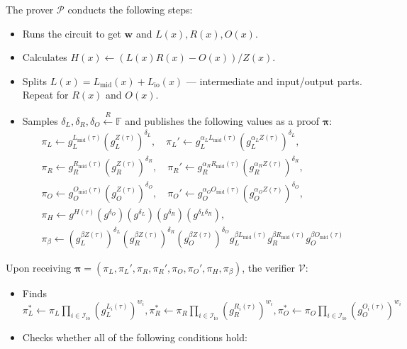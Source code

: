 \documentclass[../lecture-notes.tex]{subfiles}
\begin{document}
\begin{tcolorbox}
    The prover $\mathcal{P}$ conducts the following steps:
    \begin{itemize}[label=]
        \item Runs the circuit to get $\mathbf{w}$ and $L(x),R(x),O(x)$.
        \item Calculates $H(x) \gets (L(x)R(x) - O(x))\big/ Z(x)$.
        \item Splits $L(x) = L_{\text{mid}}(x) + L_{\text{io}}(x)$ --- intermediate and input/output parts. Repeat for $R(x)$ and $O(x)$.
        \item Samples $\delta_L, \delta_R, \delta_O \xleftarrow{R} \mathbb{F}$ and publishes the following values as a proof $\boldsymbol{\pi}$: 
        \begin{align*}
            \pi_L \gets g_L^{L_{\text{mid}}(\tau)}\left(g_L^{Z(\tau)}\right)^{\delta_L}, \quad \pi_L' \gets g_L^{\alpha_LL_{\text{mid}}(\tau)}\left(g_L^{\alpha_L Z(\tau)}\right)^{\delta_L}, \\
            \pi_R \gets g_R^{R_{\text{mid}}(\tau)}\left(g_R^{Z(\tau)}\right)^{\delta_R}, \quad \pi_R' \gets g_R^{\alpha_RR_{\text{mid}}(\tau)}\left(g_R^{\alpha_R Z(\tau)}\right)^{\delta_R}, \\
            \pi_O \gets g_O^{O_{\text{mid}}(\tau)}\left(g_O^{Z(\tau)}\right)^{\delta_O}, \quad \pi_O' \gets g_O^{\alpha_OO_{\text{mid}}(\tau)}\left(g_O^{\alpha_O Z(\tau)}\right)^{\delta_O}, \\
            \pi_H \gets g^{H(\tau)}(g^{\delta_O})(g^{\delta_L})(g^{\delta_R})(g^{\delta_L\delta_R}), \\ 
            \pi_{\beta} \gets \left(g_L^{\beta Z(\tau)}\right)^{\delta_L}\left(g_R^{\beta Z(\tau)}\right)^{\delta_R}\left(g_O^{\beta Z(\tau)}\right)^{\delta_O}g_L^{\beta L_{\text{mid}}(\tau)}g_R^{\beta R_{\text{mid}}(\tau)}g_O^{\beta O_{\text{mid}}(\tau)}
        \end{align*}
    \end{itemize}

    Upon receiving $\boldsymbol{\pi} = (\pi_L,\pi_L',\pi_R,\pi_R',\pi_O,\pi_O',\pi_H,\pi_{\beta})$, the verifier $\mathcal{V}$:
    \begin{itemize}[label=]
        \item Finds $\pi_L^* \gets \pi_L\prod_{i \in \mathcal{I}_{\text{io}}} (g_L^{L_i(\tau)})^{w_i},\pi_R^* \gets \pi_R\prod_{i \in \mathcal{I}_{\text{io}}} (g_R^{R_i(\tau)})^{w_i},\pi_O^* \gets \pi_O\prod_{i \in \mathcal{I}_{\text{io}}} (g_O^{O_i(\tau)})^{w_i}$
        \item Checks whether all of the following conditions hold:
        

\end{itemize}
\end{tcolorbox}
\end{document}
